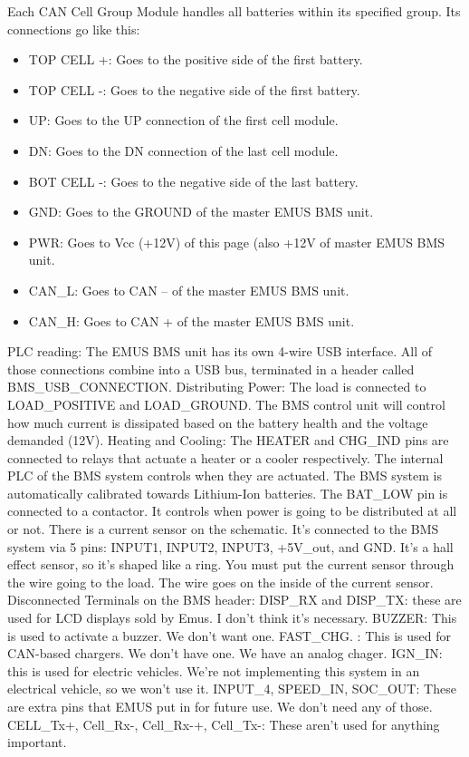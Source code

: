 Each CAN Cell Group Module handles all batteries within its specified group. Its connections go like this:

\begin{itemize}
	\item TOP CELL +: Goes to the positive side of the first battery.
	\item TOP CELL -: Goes to the negative side of the first battery.
	\item UP: Goes to the UP connection of the first cell module.
	\item DN: Goes to the DN connection of the last cell module. 
	\item BOT CELL -: Goes to the negative side of the last battery.
	\item GND: Goes to the GROUND of the master EMUS BMS unit.
	\item PWR: Goes to Vcc (+12V) of this page (also +12V of master EMUS BMS unit.
	\item CAN\_L: Goes to CAN – of the master EMUS BMS unit.
	\item CAN\_H: Goes to CAN + of the master EMUS BMS unit.
\end{itemize}
PLC reading:
The EMUS BMS unit has its own 4-wire USB interface. All of those connections combine into a USB bus, terminated in a header called BMS\_USB\_CONNECTION.
Distributing Power:
The load is connected to LOAD\_POSITIVE and LOAD\_GROUND. The BMS control unit will control how much current is dissipated based on the battery health and the voltage demanded (12V).
Heating and Cooling:
The HEATER and CHG\_IND pins are connected to relays that actuate a heater or a cooler respectively. The internal PLC of the BMS system controls when they are actuated. The BMS system is automatically calibrated towards Lithium-Ion batteries.
The BAT\_LOW pin is connected to a contactor. It controls when power is going to be distributed at all or not.
There is a current sensor on the schematic. It’s connected to the BMS system via 5 pins: INPUT1, INPUT2, INPUT3, +5V\_out, and GND. It’s a hall effect sensor, so it’s shaped like a ring. You must put the current sensor through the wire going to the load. The wire goes on the inside of the current sensor. 
Disconnected Terminals on the BMS header:
DISP\_RX and DISP\_TX: these are used for LCD displays sold by Emus. I don’t think it’s necessary.
BUZZER: This is used to activate a buzzer. We don’t want one.
FAST\_CHG. : This is used for CAN-based chargers. We don’t have one. We have an analog chager.
IGN\_IN: this is used for electric vehicles. We’re not implementing this system in an electrical vehicle, so we won’t use it.
INPUT\_4, SPEED\_IN, SOC\_OUT: These are extra pins that EMUS put in for future use. We don’t need any of those.
CELL\_Tx+, Cell\_Rx-, Cell\_Rx-+, Cell\_Tx-: These aren’t used for anything important.

